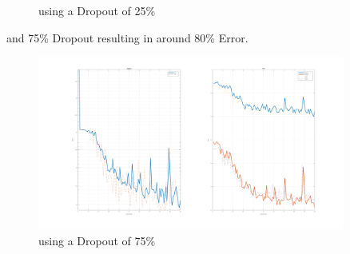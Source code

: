 \documentclass[12pt]{article}
\begin{document}
\begin{enumerate}[a)]
\begin{figure}[H]
                \caption{using a Dropout of 25\%}
        \end{figure}
        and 75\% Dropout resulting in around 80\% Error.
        \begin{figure}[H]
            \centering
                \includegraphics[width=0.9\textwidth]{Plots/3_75_100.png}
                \caption{using a Dropout of 75\%}
        \end{figure}
\end{enumerate}
\end{document}
